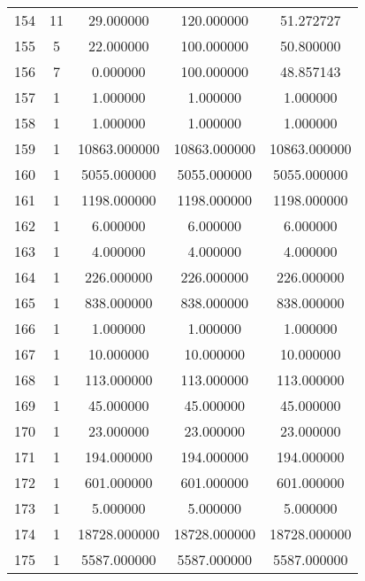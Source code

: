 \documentclass[a4paper,12pt]{article}
\begin{document}
\begin{center}
\begin{longtable}{l S[table-format=3.0] S[table-format=8.2] S[table-format=8.2] S[table-format=8.2]}
        154   &  11   &   29.000000   &    120.000000     &      51.272727 \\
        155   &   5   &   22.000000   &    100.000000     &      50.800000 \\
        156   &   7   &    0.000000   &    100.000000     &      48.857143 \\
        157   &   1   &    1.000000   &      1.000000     &       1.000000 \\
        158   &   1   &    1.000000   &      1.000000     &       1.000000 \\
        159   &   1   & 10863.000000   &  10863.000000     &    10863.000000 \\
        160   &   1   &  5055.000000   &   5055.000000     &     5055.000000 \\
        161   &   1   &  1198.000000   &   1198.000000     &     1198.000000 \\
        162   &   1   &     6.000000   &      6.000000     &       6.000000 \\
        163   &   1   &     4.000000   &      4.000000     &       4.000000 \\
        164   &   1   &   226.000000   &    226.000000     &     226.000000 \\
        165   &   1   &   838.000000   &    838.000000     &     838.000000 \\
        166   &   1   &     1.000000   &      1.000000     &       1.000000 \\
        167   &   1   &    10.000000   &     10.000000     &      10.000000 \\
        168   &   1   &   113.000000   &    113.000000     &     113.000000 \\
        169   &   1   &    45.000000   &     45.000000     &      45.000000 \\
        170   &   1   &    23.000000   &     23.000000     &      23.000000 \\
        171   &   1   &   194.000000   &    194.000000     &     194.000000 \\
        172   &   1   &   601.000000   &    601.000000     &     601.000000 \\
        173   &   1   &     5.000000   &      5.000000     &       5.000000 \\
        174   &   1   & 18728.000000   &  18728.000000     &   18728.000000 \\
        175   &   1   &  5587.000000   &   5587.000000     &    5587.000000 \\

\end{longtable}
\end{center}
\end{document}
